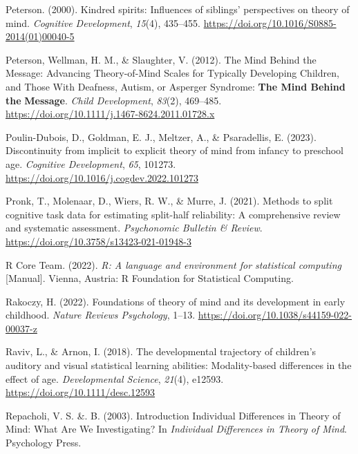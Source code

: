 \documentclass[
  man,floatsintext]{apa7}
\newlength{\cslhangindent}
\newlength{\cslentryspacingunit} %
\newenvironment{CSLReferences}[2] %
 {%
  \setlength{\parindent}{0pt}
  \ifodd #1
  \let\oldpar\par
  \def\par{\hangindent=\cslhangindent\oldpar}
  \fi
  \setlength{\parskip}{#2\cslentryspacingunit}
 }%
 {}
\begin{document}
\begin{CSLReferences}{1}{0}
\leavevmode{}%
Peterson. (2000). Kindred spirits: {Influences} of siblings' perspectives on theory of mind. \emph{Cognitive Development}, \emph{15}(4), 435--455. \url{https://doi.org/10.1016/S0885-2014(01)00040-5}

\leavevmode{}%
Peterson, Wellman, H. M., \& Slaughter, V. (2012). The {Mind Behind} the {Message}: {Advancing Theory-of-Mind Scales} for {Typically Developing Children}, and {Those With Deafness}, {Autism}, or {Asperger Syndrome}: {\textbf{The Mind Behind}}{ \textbf{the} }{\textbf{Message}}. \emph{Child Development}, \emph{83}(2), 469--485. \url{https://doi.org/10.1111/j.1467-8624.2011.01728.x}

\leavevmode{}%
Poulin-Dubois, D., Goldman, E. J., Meltzer, A., \& Psaradellis, E. (2023). Discontinuity from implicit to explicit theory of mind from infancy to preschool age. \emph{Cognitive Development}, \emph{65}, 101273. \url{https://doi.org/10.1016/j.cogdev.2022.101273}

\leavevmode{}%
Pronk, T., Molenaar, D., Wiers, R. W., \& Murre, J. (2021). Methods to split cognitive task data for estimating split-half reliability: {A} comprehensive review and systematic assessment. \emph{Psychonomic Bulletin \& Review}. \url{https://doi.org/10.3758/s13423-021-01948-3}

\leavevmode{}%
R Core Team. (2022). \emph{R: {A} language and environment for statistical computing} {[}Manual{]}. {Vienna, Austria}: {R Foundation for Statistical Computing}.

\leavevmode{}%
Rakoczy, H. (2022). Foundations of theory of mind and its development in early childhood. \emph{Nature Reviews Psychology}, 1--13. \url{https://doi.org/10.1038/s44159-022-00037-z}

\leavevmode{}%
Raviv, L., \& Arnon, I. (2018). The developmental trajectory of children's auditory and visual statistical learning abilities: Modality-based differences in the effect of age. \emph{Developmental Science}, \emph{21}(4), e12593. \url{https://doi.org/10.1111/desc.12593}

\leavevmode{}%
Repacholi, V. S. \&. B. (2003). Introduction {Individual Differences} in {Theory} of {Mind}: {What Are We Investigating}? In \emph{Individual {Differences} in {Theory} of {Mind}}. {Psychology Press}.


\end{CSLReferences}
\end{document}
